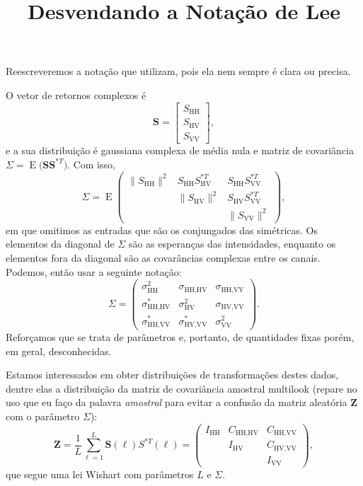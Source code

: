 \documentclass[12pt]{article}
\title{Desvendando a Notação de Lee}
\author{}
\date{}
\newcommand{\E}{\operatorname{E}}
\begin{document}
\maketitle

Reescreveremos a notação que \citet{lee} utilizam, pois ela nem sempre é clara ou precisa.

O vetor de retornos complexos é
$$
\bm S =
	\begin{bmatrix}
	S_{\text{HH}}\\
	S_{\text{HV}}\\
	S_{\text{VV}}
	\end{bmatrix},
$$
e a sua distribuição é gaussiana complexa de média nula e matriz de covariância $\Sigma=\E\big(\bm S \bm S^{*T}\big)$.
Com isso,
$$
\Sigma= \E\begin{pmatrix}
\|S_{\text{HH}}\|^2	& S_{\text{HH}} S_{\text{HV}}^{*T}	& S_{\text{HH}} S_{\text{VV}}^{*T}\\
				& \|S_{\text{HV}}\|^2					& S_{\text{HV}} S_{\text{VV}}^{*T}\\
				&										& \|S_{\text{VV}}\|^2
\end{pmatrix},
$$
em que omitimos as entradas que são os conjungados das simétricas.
Os elementos da diagonal de $\Sigma$ são as esperanças das intensidades,
enquanto os elementos fora da diagonal são as covarâncias complexas entre os canais.
Podemos, então usar a seguinte notação:
$$
\Sigma = \begin{pmatrix}
\sigma_{\text{HH}}^2		& \sigma_{\text{HH,HV}}		& \sigma_{\text{HH,VV}} \\
\sigma_{\text{HH,HV}}^* 	& \sigma_{\text{HV}}^2		& \sigma_{\text{HV,VV}} \\
\sigma_{\text{HH,VV}}^*		& \sigma_{\text{HV,VV}}^*	& \sigma_{\text{VV}}^2
\end{pmatrix}.
$$
Reforçamos que se trata de parâmetros e, portanto, de quantidades fixas porém, em geral, desconhecidas.

Estamos interessados em obter distribuições de transformações destes dados, dentre elas a distribuição da matriz de covariância amostral multilook (repare no uso que eu faço da palavra \textit{amostral} para evitar a confusão da matriz aleatória $\bm Z$ com o parâmetro $\Sigma$):
$$
\bm Z = \frac1L \sum_{\ell=1}^L \bm S(\ell) S^{*T}(\ell) = 
\begin{pmatrix}
I_{\text{HH}}	& C_{\text{HH,HV}}	& C_{\text{HH,VV}} \\
				& I_{\text{HV}}		& C_{\text{HV,VV}} \\
				&					& I_{\text{VV}} 
\end{pmatrix},
$$
que segue uma lei Wishart com parâmetros $L$ e $\Sigma$.
\end{document}
